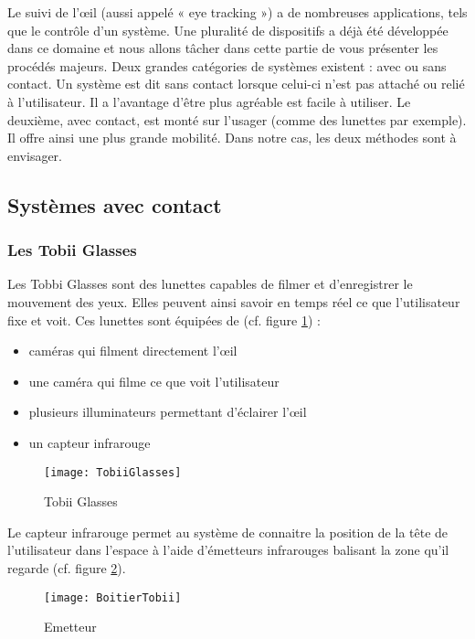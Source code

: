 Le suivi de l’œil (aussi appelé « eye tracking ») a de nombreuses applications, tels que le contrôle d’un système. Une pluralité de dispositifs a déjà été développée dans ce domaine et nous allons tâcher dans cette partie de vous présenter les procédés majeurs. Deux grandes catégories de systèmes existent : avec ou sans contact. Un système est dit sans contact lorsque celui-ci n’est pas attaché ou relié à l’utilisateur. Il a l’avantage d’être plus agréable est facile à utiliser. Le deuxième, avec contact, est monté sur l’usager (comme des lunettes par exemple). Il offre ainsi une plus grande mobilité. Dans notre cas, les deux méthodes sont à envisager.

\subsection{Systèmes avec contact}

\subsubsection{Les Tobii Glasses}

Les Tobbi Glasses \cite{tobiiglasses} sont des lunettes capables de filmer et d’enregistrer le mouvement des yeux. Elles peuvent ainsi savoir en temps réel ce que l’utilisateur fixe et voit.
Ces lunettes sont équipées de (cf. figure \ref{fig:TG}) : 
\begin{itemize}[label=\textbullet,font=\color{black}]
\item caméras qui filment directement l’œil
\item une caméra qui filme ce que voit l’utilisateur
\item plusieurs illuminateurs permettant d’éclairer l’œil
\item un capteur infrarouge
\end{itemize}

\begin{figure}[h]
  \centering
  \texttt{[image: TobiiGlasses]}
  \caption{Tobii Glasses}
  \label{fig:TG}
\end{figure}

Le capteur infrarouge permet au système de connaitre la position de la tête de l’utilisateur dans l’espace à l’aide d’émetteurs infrarouges balisant la zone qu'il regarde (cf. figure \ref{fig:Emetteur}).

\begin{figure}[H]
  \centering
  \texttt{[image: BoitierTobii]}
  \caption{Emetteur}
  \label{fig:Emetteur}
\end{figure}

